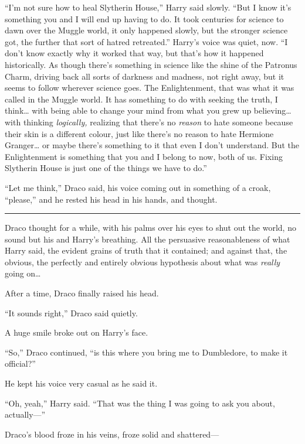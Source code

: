 ``I'm not sure how to heal Slytherin House,'' Harry said slowly. ``But I
know it's something you and I will end up having to do. It took
centuries for science to dawn over the Muggle world, it only happened
slowly, but the stronger science got, the further that sort of hatred
retreated.'' Harry's voice was quiet, now. ``I don't know exactly why it
worked that way, but that's how it happened historically. As though
there's something in science like the shine of the Patronus Charm,
driving back all sorts of darkness and madness, not right away, but it
seems to follow wherever science goes. The Enlightenment, that was what
it was called in the Muggle world. It has something to do with seeking
the truth, I think\ldots{} with being able to change your mind from what
you grew up believing\ldots{} with thinking \emph{logically,} realizing
that there's no \emph{reason} to hate someone because their skin is a
different colour, just like there's no reason to hate Hermione
Granger\ldots{} or maybe there's something to it that even I don't
understand. But the Enlightenment is something that you and I belong to
now, both of us. Fixing Slytherin House is just one of the things we
have to do.''

``Let me think,'' Draco said, his voice coming out in something of a
croak, ``please,'' and he rested his head in his hands, and thought.

\begin{center}\rule{3in}{0.4pt}\end{center}

Draco thought for a while, with his palms over his eyes to shut out the
world, no sound but his and Harry's breathing. All the persuasive
reasonableness of what Harry said, the evident grains of truth that it
contained; and against that, the obvious, the perfectly and entirely
obvious hypothesis about what was \emph{really} going on\ldots{}

After a time, Draco finally raised his head.

``It sounds right,'' Draco said quietly.

A huge smile broke out on Harry's face.

``So,'' Draco continued, ``is this where you bring me to Dumbledore, to
make it official?''

He kept his voice very casual as he said it.

``Oh, yeah,'' Harry said. ``That was the thing I was going to ask you
about, actually---''

Draco's blood froze in his veins, froze solid and shattered---

